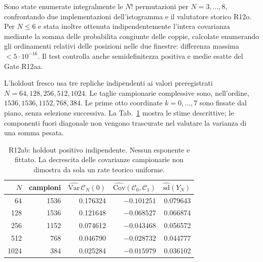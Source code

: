 \documentclass[11pt,a4paper]{article}
\begin{document}
Sono state enumerate integralmente le $N!$ permutazioni per $N=3,\ldots,8$, confrontando due implementazioni dell'istogramma e il valutatore storico R12o. Per $N\le6$ e stata inoltre ottenuta indipendentemente l'intera covarianza mediante la somma delle probabilita congiunte delle coppie, calcolate enumerando gli ordinamenti relativi delle posizioni nelle due finestre: differenza massima $<5\cdot10^{-16}$. Il test controlla anche semidefinitezza positiva e medie esatte del Gate R12aa.

L'holdout fresco usa tre repliche indipendenti ai valori preregistrati $N=64,128,256,512,1024$. Le taglie campionarie complessive sono, nell'ordine, $1536,1536,1152,768,384$. Le prime otto coordinate $k=0,\ldots,7$ sono fissate dal piano, senza selezione successiva. La Tab.~\ref{tab:r12ab_holdout} mostra le stime descrittive; le componenti fuori diagonale non vengono trascurate nel valutare la varianza di una somma pesata.

\begin{table}[H]
\centering\small
\begin{tabular}{rrrrr}
\toprule
$N$ & campioni & $\widehat{\mathrm{Var}}\,\mathcal C_N(0)$ & $\widehat{\mathrm{Cov}}(\mathcal C_0,\mathcal C_1)$ & $\widehat{\mathrm{sd}}(Y_N)$\\
\midrule
64&1536&0.176324&$-0.101251$&0.079643\\
128&1536&0.121648&$-0.068527$&0.066874\\
256&1152&0.074612&$-0.043468$&0.056572\\
512&768&0.046790&$-0.028732$&0.044777\\
1024&384&0.025284&$-0.015979$&0.036102\\
\bottomrule
\end{tabular}
\caption{R12ab: holdout positivo indipendente. Nessun esponente e fittato. La decrescita delle covarianze campionarie non dimostra da sola un rate teorico uniforme.}
\label{tab:r12ab_holdout}
\end{table}
\end{document}

